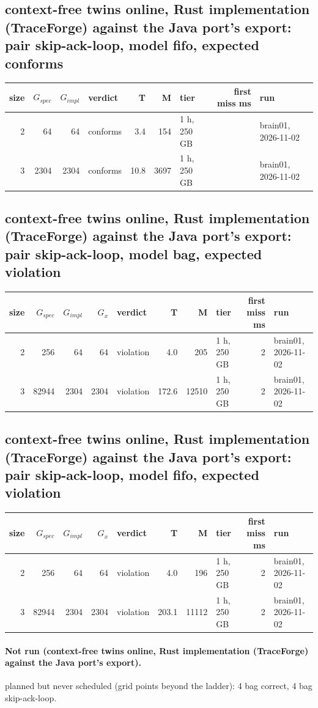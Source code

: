 \documentclass[10pt]{article}
\begin{document}
\subsection*{context-free twins online, Rust implementation (TraceForge) against the Java port's export: pair \textsf{skip-ack-loop}, model fifo, expected conforms}
\begin{longtable}{@{}rrrlrrlrl@{}}
\toprule
size & $G_{\mathit{spec}}$ & $G_{\mathit{impl}}$ & verdict & T & M & tier & first miss ms & run \\
\midrule
\endhead
\color{red} 2 & 64 & 64 & conforms & 3.4 & 154 & 1 h, 250 GB &  & brain01, 2026-11-02 \\
\color{red} 3 & 2304 & 2304 & conforms & 10.8 & 3697 & 1 h, 250 GB &  & brain01, 2026-11-02 \\
\bottomrule
\end{longtable}
\subsection*{context-free twins online, Rust implementation (TraceForge) against the Java port's export: pair \textsf{skip-ack-loop}, model bag, expected violation}
\begin{longtable}{@{}rrrrlrrlrl@{}}
\toprule
size & $G_{\mathit{spec}}$ & $G_{\mathit{impl}}$ & $G_x$ & verdict & T & M & tier & first miss ms & run \\
\midrule
\endhead
\color{red} 2 & 256 & 64 & 64 & violation & 4.0 & 205 & 1 h, 250 GB & 2 & brain01, 2026-11-02 \\
\color{red} 3 & 82944 & 2304 & 2304 & violation & 172.6 & 12510 & 1 h, 250 GB & 2 & brain01, 2026-11-02 \\
\bottomrule
\end{longtable}
\subsection*{context-free twins online, Rust implementation (TraceForge) against the Java port's export: pair \textsf{skip-ack-loop}, model fifo, expected violation}
\begin{longtable}{@{}rrrrlrrlrl@{}}
\toprule
size & $G_{\mathit{spec}}$ & $G_{\mathit{impl}}$ & $G_x$ & verdict & T & M & tier & first miss ms & run \\
\midrule
\endhead
\color{red} 2 & 256 & 64 & 64 & violation & 4.0 & 196 & 1 h, 250 GB & 2 & brain01, 2026-11-02 \\
\color{red} 3 & 82944 & 2304 & 2304 & violation & 203.1 & 11112 & 1 h, 250 GB & 2 & brain01, 2026-11-02 \\
\bottomrule
\end{longtable}
\paragraph{Not run (context-free twins online, Rust implementation (TraceForge) against the Java port's export).}
planned but never scheduled (grid points beyond the ladder): 4 bag correct, 4 bag skip-ack-loop.\par
\end{document}
